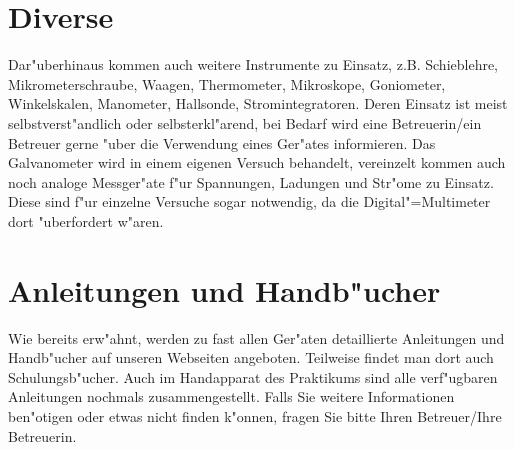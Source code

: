 \section{Diverse}

Dar"uberhinaus kommen auch weitere Instrumente zu Einsatz, z.B.
Schieblehre,
Mikrometerschraube, Waagen, Thermometer,
Mikroskope, Goniometer, Winkelskalen, Manometer, Hallsonde,
Stromintegratoren. Deren Einsatz ist meist selbstverst"andlich oder
selbsterkl"arend, bei Bedarf wird eine Betreuerin/ein Betreuer
gerne "uber die Verwendung eines Ger"ates informieren. Das
Galvanometer wird in einem eigenen Versuch behandelt, vereinzelt
kommen auch noch analoge Messger"ate f"ur Spannungen, Ladungen und
Str"ome zu Einsatz. Diese sind f"ur einzelne Versuche sogar
notwendig, da die Digital"=Multimeter dort "uberfordert w"aren.

\section{Anleitungen und Handb"ucher}

Wie bereits erw"ahnt, werden zu fast allen Ger"aten
detaillierte Anleitungen und
Handb"ucher auf unseren
Webseiten angeboten.
Teilweise findet man dort auch Schulungsb"ucher. Auch im
Handapparat des Praktikums sind alle verf"ugbaren Anleitungen
nochmals zusammengestellt. Falls Sie weitere Informationen
ben"otigen oder etwas nicht finden k"onnen, fragen Sie bitte Ihren
Betreuer/Ihre Betreuerin.
